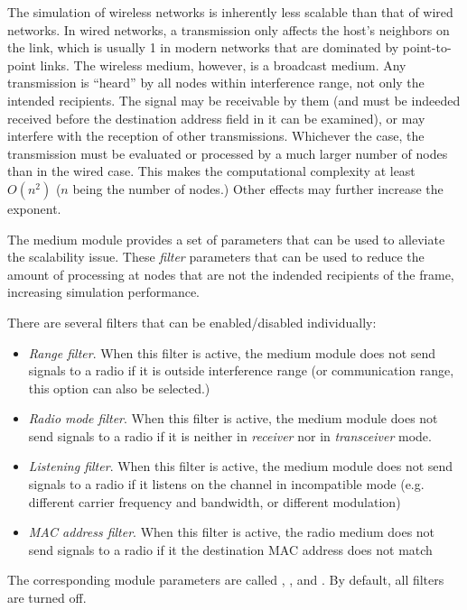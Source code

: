 The simulation of wireless networks is inherently less scalable than
that of wired networks. In wired networks, a transmission only affects 
the host's neighbors on the link, which is usually 1 in modern networks
that are dominated by point-to-point links. The wireless medium, however, 
is a broadcast medium. Any transmission is ``heard'' by all nodes 
within interference range, not only the intended recipients.
The signal may be receivable by them (and must be indeeded received 
before the destination address field in it can be examined), 
or may interfere with the reception of other transmissions.
Whichever the case, the transmission must be evaluated or processed
by a much larger number of nodes than in the wired case. 
This makes the computational complexity at least $O(n^2)$ ($n$ being
the number of nodes.) Other effects may further increase the exponent.

The medium module provides a set of parameters that can be used
to alleviate the scalability issue. These \textit{filter} parameters
that can be used to reduce the amount of processing at nodes that are
not the indended recipients of the frame, increasing simulation performance.

There are several filters that can be enabled/disabled individually:

\begin{itemize}
  \item \textit{Range filter}. When this filter is active, the medium module
    does not send signals to a radio if it is outside interference range 
    (or communication range, this option can also be selected.)
  \item \textit{Radio mode filter}. When this filter is active, 
    the medium module does not send signals to a radio if it is neither 
    in \textit{receiver} nor in \textit{transceiver} mode.
  \item \textit{Listening filter}. When this filter is active, the medium module 
    does not send signals to a radio if it listens on the channel in 
    incompatible mode (e.g. different carrier frequency and bandwidth, 
    or different modulation)
  \item \textit{MAC address filter}. When this filter is active, the radio medium 
    does not send signals to a radio if it the destination MAC address
    does not match
\end{itemize}

The corresponding module parameters are called ,
,  and . 
By default, all filters are turned off.

